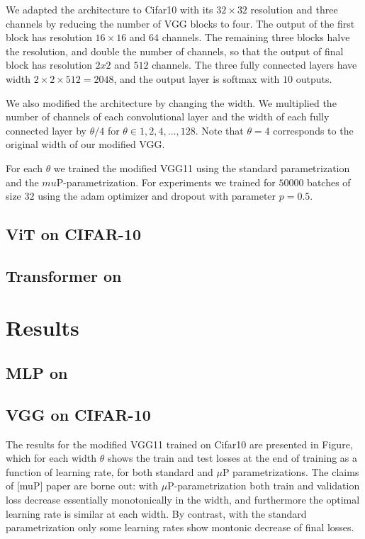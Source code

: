 \documentclass{article}
\begin{document}
We adapted the architecture to Cifar10 with its  $32\times32$ resolution and three channels by reducing the number of VGG blocks to four. The output of the first block has resolution $16 \times 16$ and $64$ channels. The remaining three blocks halve the resolution, and double the number of channels, so that the output of final block has resolution $2x2$ and $512$ channels. The three fully connected layers have width $2\times2\times512=2048$, and the output layer is softmax with $10$ outputs.

We also modified the architecture by changing the width. We multiplied the number of channels of each convolutional layer and the width of each fully connected layer by $\theta/4$ for $\theta \in {1,2,4,\ldots,128}$. Note that $\theta=4$ corresponds to the original width of our modified VGG.

For each $\theta$ we trained the modified VGG11 using the standard parametrization and the $mu$P-parametrization. For experiments we trained for $50 000$ batches of size $32$ using the adam optimizer and dropout with parameter $p=0.5$.

\subsection{ViT on CIFAR-10}

\subsection{Transformer on}

\section{Results}
\subsection{MLP on}

\subsection{VGG on CIFAR-10}
The results for the modified VGG11 trained on Cifar10 are presented in Figure, which for each width $\theta$ shows the train and test losses at the end of training as a function of learning rate, for both standard and $\mu$P parametrizations. The claims of [muP] paper are borne out: with $\mu$P-parametrization both train and validation loss decrease essentially monotonically in the width, and furthermore the optimal learning rate is similar at each width. By contrast, with the standard parametrization only {\color{red}some learning rates show montonic decrease of final losses.}
\end{document}

